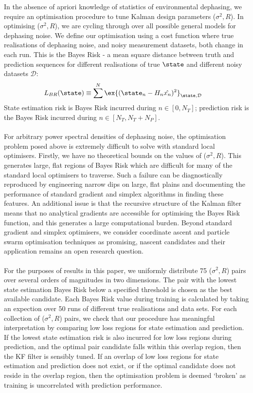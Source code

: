In the absence of apriori knowledge of statistics of environmental dephasing, we require an optimisation procedure to tune Kalman design parameters ($\sigma^2, R$). In optimising ($\sigma^2, R$), we are cycling through over all possible general models for dephasing noise. We define our optimisation using a cost function where true realisations of dephasing noise, and noisy measurement datasets, both change in each run. This is the Bayes Risk - a mean square distance between truth and prediction sequences for different realisations of true $\state$ and different noisy datasets $\mathcal{D}$:
\begin{align}
L_{BR}(\state) & \equiv \sum^{N}\ex{(\state_n - H_n\hat{x_n})^2}_{\state,\mathcal{D}} \label{eqn:sec:ap_opt_LossBR}
\end{align}
State estimation risk is Bayes Risk incurred during $n \in [0, N_T]$; prediction risk is the Bayes Risk incurred during $n \in [N_T, N_T + N_P]$. 
\\
\\
For arbitrary power spectral densities of dephasing noise, the optimisation problem posed above is extremely difficult to solve with standard local optimisers. Firstly, we have no theoretical bounds on the values of ($\sigma^2, R$). This generates large, flat regions of Bayes Risk which are difficult for many of the standard local optimisers to traverse. Such a failure can be diagnostically reproduced by engineering narrow dips on large, flat plains and documenting the performance of standard gradient and simplex algorithms in finding these features. An additional issue is that the recursive structure of the Kalman filter means that no analytical gradients are accessible  for optimising the Bayes Risk function, and this generates a large computational burden. Beyond standard gradient and simplex optimisers, we consider coordinate ascent \cite{abbeel2005} and particle swarm optimisation techniques as promising, nascent candidates and their application remains an open research question. 
\\
\\
For the purposes of results in this paper, we uniformly distribute 75 ($\sigma^2, R$) pairs over several orders of magnitudes in two dimensions. The pair with the lowest state estimation Bayes Risk below a specified threshold is chosen as the best available candidate. Each Bayes Risk value during training is calculated by taking an expection over 50 runs of different true realisations and data sets. For each collection of ($\sigma^2, R$) pairs, we check that our procedure has meaningful interpretation by comparing low loss regions for state estimation and prediction. If the lowest state estimation risk is also incurred for low loss regions during prediction, and the optimal pair candidate falls within this overlap region, then the KF filter is sensibly tuned. If an overlap of low loss regions for state estimation and prediction does not exist, or if the optimal candidate does not reside in the overlap region, then the optimisation problem is deemed `broken' as training is uncorrelated with prediction performance. 
